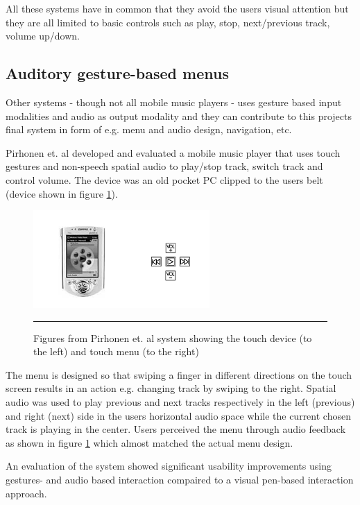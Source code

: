 All these systems have in common that they avoid the users visual attention but they are all limited to basic controls such as play, stop, next/previous track, volume up/down.

\subsection{Auditory gesture-based menus}
Other systems - though not all mobile music players - uses gesture based input modalities and audio as output modality and they can contribute to this projects final system in form of e.g. menu and audio design, navigation, etc.

Pirhonen et. al \cite{pirhonen_gestural_2002} developed and evaluated a mobile music player that uses touch gestures and non-speech spatial audio to play/stop track, switch track and control volume. The device was an old pocket PC clipped to the users belt (device shown in figure \ref{fig:pirhonen}).

\begin{figure}[htbp]
	\centering
		\includegraphics[width=0.6\textwidth,height=\textheight,keepaspectratio]{./Figures/pirhonen-system.png}
		\rule{35em}{0.5pt}
	\caption[Pirhonen system]{Figures from Pirhonen et. al \cite{pirhonen_gestural_2002} system showing the touch device (to the left) and touch menu (to the right)}
	\label{fig:pirhonen}
\end{figure}

The menu is designed so that swiping a finger in different directions on the touch screen results in an action e.g. changing track by swiping to the right. Spatial audio was used to play previous and next tracks respectively in the left (previous) and right (next) side in the users horizontal audio space while the current chosen track is playing in the center. Users perceived the menu through audio feedback as shown in figure \ref{fig:pirhonen} which almost matched the actual menu design.

An evaluation of the system showed significant usability improvements using gestures- and audio based interaction compaired to a visual pen-based interaction approach.


